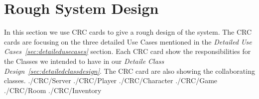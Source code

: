 \section{Rough System Design}
In this section we use CRC cards to give a rough design of the system. The CRC cards are focusing on the three detailed Use Cases mentioned in the \emph{Detailed Use Cases~\ref{sec:detailedusecases}} section. Each CRC card show the responsibilities for the Classes we intended to have in our \emph{Detaile Class Design~\ref{sec:detailedclassdesign}}. The CRC card are also showing the collaborating classes. \newline \newline
{./CRC/Server}
{./CRC/Player}
{./CRC/Character}
{./CRC/Game}
{./CRC/Room}
{./CRC/Inventory}
